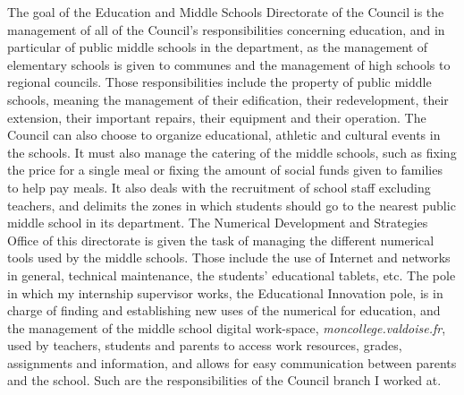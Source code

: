 \documentclass[12pt]{article}
\begin{document}
The goal of the Education and Middle Schools Directorate of the Council is the management of all of the Council's responsibilities concerning education, and in particular of public middle schools in the department, as the management of elementary schools is given to communes and the management of high schools to regional councils. Those responsibilities include the property of public middle schools, meaning the management of their edification, their redevelopment, their extension, their important repairs, their equipment and their operation. The Council can also choose to organize educational, athletic and cultural events in the schools. It must also manage the catering of the middle schools, such as fixing the price for a single meal or fixing the amount of social funds given to families to help pay meals. It also deals with the recruitment of school staff excluding teachers, and delimits the zones in which students should go to the nearest public middle school in its department. The Numerical Development and Strategies Office of this directorate is given the task of managing the different numerical tools used by the middle schools. Those include the use of Internet and networks in general, technical maintenance, the students' educational tablets, etc. The pole in which my internship supervisor works, the Educational Innovation pole, is in charge of finding and establishing new uses of the numerical for education, and the management of the middle school digital work-space, \textit{moncollege.valdoise.fr}, used by teachers, students and parents to access work resources, grades, assignments and information, and allows for easy communication between parents and the school. Such are the responsibilities of the Council branch I worked at. \\
\end{document}

